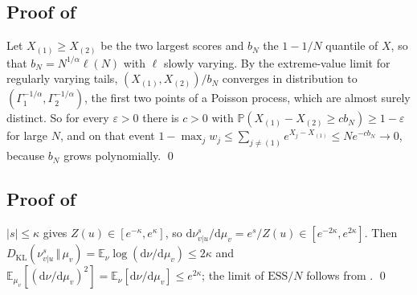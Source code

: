 \documentclass[11pt]{article}
\theoremstyle{plain}
\theoremstyle{definition}
\theoremstyle{remark}
\newcommand{\E}{\mathbb{E}}
\newcommand{\Dd}{\mathrm{d}}
\newcommand{\KL}[2]{D_{\mathrm{KL}}\!\left(#1\,\Vert\,#2\right)}
\newcommand{\abs}[1]{\left\lvert #1 \right\rvert}
\newcommand{\ESS}{\mathrm{ESS}}
\begin{document}
\subsection{Proof of \texorpdfstring{}{Proposition 4.6}}
\label{app:collapse}
Let $X_{(1)}\ge X_{(2)}$ be the two largest scores and $b_N$ the
$1-1/N$ quantile of $X$, so that $b_N=N^{1/\alpha}\ell(N)$ with $\ell$ slowly
varying. By the extreme-value limit for regularly varying tails,
$(X_{(1)},X_{(2)})/b_N$ converges in distribution to
$(\Gamma_1^{-1/\alpha},\Gamma_2^{-1/\alpha})$, the first two points of a
Poisson process, which are almost surely distinct. So for every
$\varepsilon>0$ there is $c>0$ with
$\mathbb{P}(X_{(1)}-X_{(2)}\ge cb_N)\ge1-\varepsilon$ for large $N$, and on
that event
$1-\max_j w_j\le\sum_{j\neq(1)}e^{X_j-X_{(1)}}\le Ne^{-cb_N}\to0$, because
$b_N$ grows polynomially.
\qed

\subsection{Proof of \texorpdfstring{}{Proposition 4.7}}
\label{app:twosided}
$\abs{s}\le\kappa$ gives $Z(u)\in[e^{-\kappa},e^{\kappa}]$, so
$\Dd\nu^{s}_{v\vert u}/\Dd\mu_v=e^{s}/Z(u)\in[e^{-2\kappa},e^{2\kappa}]$.
Then
$\KL{\nu^{s}_{v\vert u}}{\mu_v}=\E_{\nu}\log(\Dd\nu/\Dd\mu_v)\le2\kappa$ and
$\E_{\mu_v}[(\Dd\nu/\Dd\mu_v)^{2}]=\E_{\nu}[\Dd\nu/\Dd\mu_v]\le e^{2\kappa}$;
the limit of $\ESS/N$ follows from .
\qed
\end{document}

